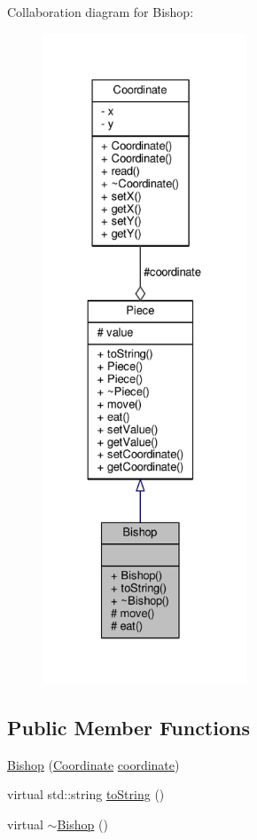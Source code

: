 Collaboration diagram for Bishop\+:
\nopagebreak
\begin{figure}[H]
\begin{center}
\leavevmode
\includegraphics[height=550pt]{class_bishop__coll__graph}
\end{center}
\end{figure}
\subsection*{Public Member Functions}
\begin{DoxyCompactItemize}
\item 
\hyperlink{class_bishop_abc54c861677423ac25f0c819cb9cbb55}{Bishop} (\hyperlink{class_coordinate}{Coordinate} \hyperlink{class_piece_a9e92373c8fffc1f5efb20d62204b70cf}{coordinate})
\item 
virtual std\+::string \hyperlink{class_bishop_af69ba4eec8bcf5dad66c8071a168bdba}{to\+String} ()
\item 
virtual \hyperlink{class_bishop_a3705b4537a39d09a59143fe01a62442f}{$\sim$\+Bishop} ()
\end{DoxyCompactItemize}
